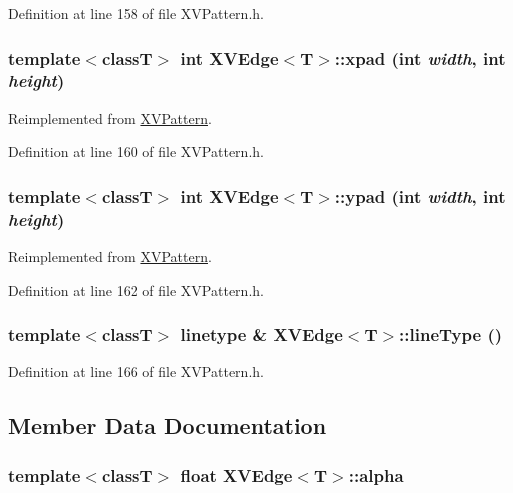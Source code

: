 Definition at line 158 of file XVPattern.h.\label{XVEdge_a3}
\hypertarget{class_XVEdge_a3}{
\subsubsection[xpad]{\setlength{\rightskip}{0pt plus 5cm}template$<$classT$>$ int XVEdge$<$T$>$::xpad (int {\em width}, int {\em height})}}




Reimplemented from \hyperlink{class_XVPattern}{XVPattern}.

Definition at line 160 of file XVPattern.h.\label{XVEdge_a4}
\hypertarget{class_XVEdge_a4}{
\subsubsection[ypad]{\setlength{\rightskip}{0pt plus 5cm}template$<$classT$>$ int XVEdge$<$T$>$::ypad (int {\em width}, int {\em height})}}




Reimplemented from \hyperlink{class_XVPattern}{XVPattern}.

Definition at line 162 of file XVPattern.h.\label{XVEdge_a6}
\hypertarget{class_XVEdge_a6}{
\subsubsection[lineType]{\setlength{\rightskip}{0pt plus 5cm}template$<$classT$>$ linetype \& XVEdge$<$T$>$::line\-Type ()}}




Definition at line 166 of file XVPattern.h.

\subsection{Member Data Documentation}
\label{XVEdge_o0}
\hypertarget{class_XVEdge_o0}{
\subsubsection[alpha]{\setlength{\rightskip}{0pt plus 5cm}template$<$classT$>$ float XVEdge$<$T$>$::alpha}}




